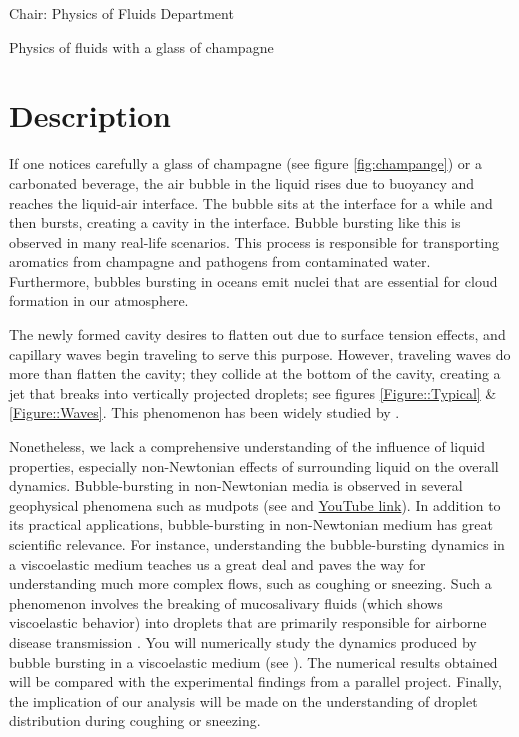 \documentclass[a4paper,10pt]{article}
\begin{document}
\noindent Chair: Physics of Fluids Department
\begin{center}
 \begin{LARGE}
  Physics of fluids with a glass of champagne
 \end{LARGE}
\end{center}
\section*{Description}
If one notices carefully a glass of champagne (see figure \ref{fig:champange}) or a carbonated beverage, the air bubble in the liquid rises due to buoyancy and reaches the liquid-air interface. The bubble sits at the interface for a while and then bursts, creating a cavity in the interface. Bubble bursting like this is observed in many real-life scenarios. This process is responsible for transporting aromatics from champagne and pathogens from contaminated water. Furthermore, bubbles bursting in oceans emit nuclei that are essential for cloud formation in our atmosphere. 

The newly formed cavity desires to flatten out due to surface tension effects, and capillary waves begin traveling to serve this purpose. However, traveling waves do more than flatten the cavity; they collide at the bottom of the cavity, creating a jet that breaks into vertically projected droplets; see figures \ref{Figure::Typical} \& \ref{Figure::Waves}. This phenomenon has been widely studied by \citet{duchemin2002jet, walls2015jet, deike2018dynamics, gordillo2019capillary}.

Nonetheless, we lack a comprehensive understanding of the influence of liquid properties, especially non-Newtonian effects of surrounding liquid on the overall dynamics. Bubble-bursting in non-Newtonian media is observed in several geophysical phenomena such as mudpots (see \citet{sanjay_lohse_jalaal_2021,balasubramanianBurstingBubbleElastoviscoplastic2024} and \href{https://www.youtube.com/watch?v=a9hUsVq9q7U}{YouTube link}). In addition to its practical applications, bubble-bursting in non-Newtonian medium has great scientific relevance. For instance, understanding the bubble-bursting dynamics in a viscoelastic medium teaches us a great deal and paves the way for understanding much more complex flows, such as coughing or sneezing. Such a phenomenon involves the breaking of mucosalivary fluids (which shows viscoelastic behavior) into droplets that are primarily responsible for airborne disease transmission \citep{walls2017quantifying, bourouiba2021fluid}. You will numerically study the dynamics produced by bubble bursting in a viscoelastic medium (see \citet{dixit2024viscoelastic}). The numerical results obtained will be compared with the experimental findings from a parallel project. Finally, the implication of our analysis will be made on the understanding of droplet distribution during coughing or sneezing. 
\end{document}

